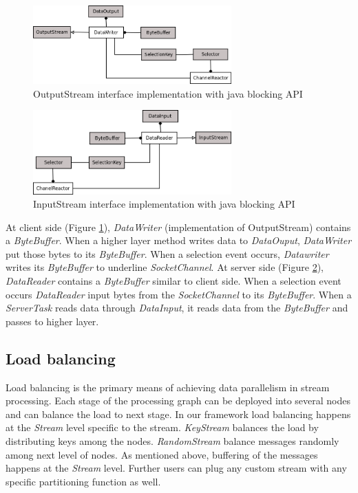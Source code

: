 \begin{figure}[!t]
        \centering
        \includegraphics[width=3.0in]{client.png}
        \caption{OutputStream interface implementation with java blocking API}
        \label{client}
\end{figure}
\begin{figure}[!t]
        \centering
        \includegraphics[width=3.0in]{server.png}
        \caption{InputStream interface implementation with java blocking API}
        \label{server}
\end{figure}

At client side (Figure \ref{client}), \textit{DataWriter} (implementation of  OutputStream) contains a \textit{ByteBuffer}. When a higher layer method writes data to \textit{DataOuput}, \textit{DataWriter} put those bytes to its \textit{ByteBuffer}. When a selection event occurs, \textit{Datawriter} writes its \textit{ByteBuffer} to underline \textit{SocketChannel}. At server side (Figure \ref{server}), \textit{DataReader} contains a \textit{ByteBuffer} similar to client side. When a selection event occurs \textit{DataReader} input bytes from the \textit{SocketChannel} to its \textit{ByteBuffer}. When a \textit{ServerTask} reads data through \textit{DataInput}, it reads data from the \textit{ByteBuffer} and passes to higher layer. 

\subsection{Load balancing}
Load balancing is the primary means of achieving data parallelism in stream processing. Each stage of the processing graph can be deployed into several nodes and can balance the load to next stage. In our framework load balancing happens at the \textit{Stream} level specific to the stream. \textit{KeyStream} balances the load by distributing keys among the nodes. \textit{RandomStream} balance messages randomly among next level of nodes. As mentioned above, buffering of the messages happens at the \textit{Stream} level. Further users can plug any custom stream with any specific partitioning function as well.

